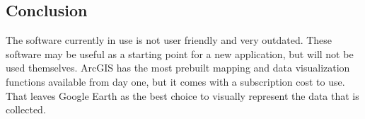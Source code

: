 \documentclass[onecolumn, 10pt, compsoc]{IEEEtran}
\begin{document}
\subsection{Conclusion}
The software currently in use is not user friendly and very outdated. These software may be useful as a starting point for a new application, but will not be used themselves. ArcGIS has the most prebuilt mapping and data visualization functions available from day one, but it comes with a subscription cost to use. That leaves Google Earth as the best choice to visually represent the data that is collected.


\end{document}
